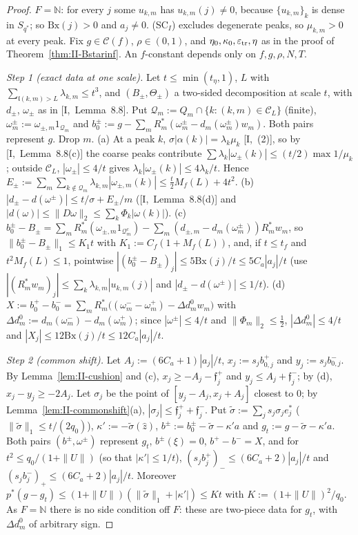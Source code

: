 \documentclass[10pt]{amsart}
\theoremstyle{definition}
\theoremstyle{remark}
\newcommand{\N}{\mathbb N}
\newcommand{\Cset}{\mathcal C}
\newcommand{\zh}{\hat z}
\begin{document}
\begin{proof}
$F=\N$: for every $j$ some $u_{k,m}$ has $u_{k,m}(j)\ne0$, because
$\{u_{k,m}\}_k$ is dense in $S_{q^*}$; so $\mathrm{Bx}(j)>0$ and $a_j\ne0$.
(SC$_I$) excludes degenerate peaks, so $\mu_{k,m}>0$ at every peak.  Fix
$g\in\Cset(f)$, $\rho\in(0,1)$, and $\eta_0,\kappa_0,\varepsilon_{\rm tr},\eta$
as in the proof of Theorem~\ref{thm:II-Bstarinf}.  An $f$-constant depends
only on $f,g,\rho,N,T$.

\emph{Step 1 (exact data at one scale).}  Let $t\le\min(t_\eta,1)$, $L$ with
$\sum_{\mathfrak l(k,m)>L}\lambda_{k,m}\le t^3$, and $(B_\pm,\Theta_\pm)$ a
two-sided decomposition at scale $t$, with $d_\pm$, $\omega_\pm$ as in
[I,~Lemma~8.8].  Put $\mathcal Q_m:=Q_m\cap\{k:(k,m)\in\mathcal C_L\}$
(finite), $\omega^\pm_m:=\omega_{\pm,m}1_{\mathcal Q_m}$ and
$b^\pm_0:=g-\sum_mR_m^*(\omega^\pm_m-d_m(\omega^\pm_m)w_m)$.  Both pairs
represent $g$.  Drop $m$.
(a) At a peak $k$, $\sigma|\alpha(k)|=\lambda_k\mu_k$ [I,~(2)], so by
[I,~Lemma~8.8(c)] the coarse peaks contribute $\sum\lambda_k|\omega_\pm(k)|\le
(t/2)\max1/\mu_k$; outside $\mathcal C_L$, $|\omega_\pm|\le4/t$ gives
$\lambda_k|\omega_\pm(k)|\le4\lambda_k/t$.  Hence
$E_\pm:=\sum_m\sum_{k\notin\mathcal Q_m}\lambda_{k,m}|\omega_{\pm,m}(k)|\le
\frac t2M_f(L)+4t^2$.
(b) $|d_\pm-d(\omega^\pm)|\le t/\sigma+E_\pm/m$ ([I,~Lemma~8.8(d)] and
$|d(\omega)|\le\|D\omega\|_2\le\sum_k\Phi_k|\omega(k)|$).
(c) $b^\pm_0-B_\pm=\sum_mR_m^*(\omega_{\pm,m}1_{\mathcal Q_m^c})-\sum_m(d_{\pm,m}-
d_m(\omega^\pm_m))R_m^*w_m$, so $\|b^\pm_0-B_\pm\|_1\le K_1t$ with
$K_1:=C_f(1+M_f(L))$, and, if $t\le t_f$ and $t^2M_f(L)\le1$, pointwise
$|(b^\pm_0-B_\pm)_j|\le5\mathrm{Bx}(j)/t\le5C_a|a_j|/t$ (use
$|(R_m^*w_m)_j|\le\sum_k\lambda_{k,m}|u_{k,m}(j)|$ and $|d_\pm-d(\omega^\pm)|
\le1/t$).
(d) $X:=b^+_0-b^-_0=\sum_mR_m^*\big((\omega^-_m-\omega^+_m)-\Delta d^0_mw_m\big)$
with $\Delta d^0_m:=d_m(\omega^-_m)-d_m(\omega^+_m)$; since
$|\omega^\pm|\le4/t$ and $\|\Phi_m\|_2\le\frac12$, $|\Delta d^0_m|\le4/t$ and
$|X_j|\le12\mathrm{Bx}(j)/t\le12C_a|a_j|/t$.

\emph{Step 2 (common shift).}  Let $A_j:=(6C_a+1)|a_j|/t$, $x_j:=s_j
b^+_{0,j}$ and $y_j:=s_jb^-_{0,j}$.  By Lemma~\ref{lem:II-cushion} and (c),
$x_j\ge-A_j-\mathfrak f^+_j$ and $y_j\le A_j+\mathfrak f^-_j$; by (d),
$x_j-y_j\ge-2A_j$.  Let $\sigma_j$ be the point of $[y_j-A_j,x_j+A_j]$ closest
to $0$; by Lemma~\ref{lem:II-commonshift}(a), $|\sigma_j|\le\mathfrak f^+_j+
\mathfrak f^-_j$.  Put $\tilde\sigma:=\sum_js_j\sigma_je^*_j$
($\|\tilde\sigma\|_1\le t/(2q_0)$), $\kappa':=-\tilde\sigma(\zh)$,
$b^\pm:=b^\pm_0-\tilde\sigma-\kappa'a$ and $g_t:=g-\tilde\sigma-\kappa'a$.  Both
pairs $(b^\pm,\omega^\pm)$ represent $g_t$, $b^\pm(\xi)=0$, $b^+-b^-=X$, and for
$t^2\le q_0/(1+\|U\|)$ (so that $|\kappa'|\le1/t$), $(s_jb^+_j)_-\le
(6C_a+2)|a_j|/t$ and $(s_jb^-_j)_+\le(6C_a+2)|a_j|/t$.  Moreover
$p^*(g-g_t)\le(1+\|U\|)(\|\tilde\sigma\|_1+|\kappa'|)\le Kt$ with
$K:=(1+\|U\|)^2/q_0$.  As $F=\N$ there is no side condition off $F$: these
are two-piece data for $g_t$, with $\Delta d^0_m$ of arbitrary sign.


\end{proof}
\end{document}
